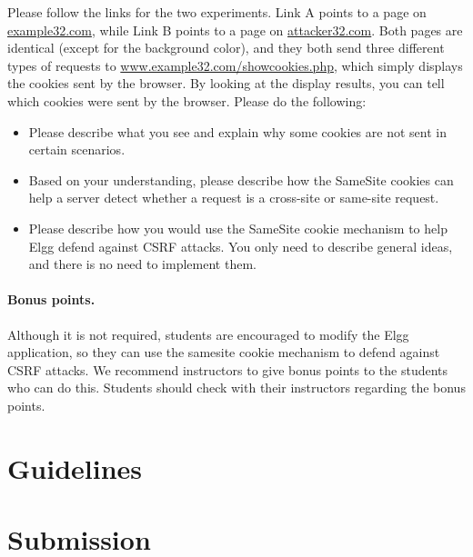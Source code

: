 Please follow the links for the two experiments. Link A points to a page 
on \url{example32.com}, while Link B points to a page 
on \url{attacker32.com}. Both pages are identical (except for the background
color), and they both send three different types of requests to
\url{www.example32.com/showcookies.php}, which
simply displays the cookies sent by the browser. By looking 
at the display results, you can tell which cookies were sent 
by the browser. Please do the following: 


\begin{itemize}
\item Please describe what you see and explain why some cookies are 
not sent in certain scenarios. 
 
\item Based on your understanding, please describe how the SameSite
cookies can help a server detect whether a request 
is a cross-site or same-site request. 

\item Please describe how you would use
the SameSite cookie mechanism to help Elgg defend against CSRF attacks. 
You only need to describe general ideas, and there is no need to 
implement them. 
\end{itemize}


\paragraph{Bonus points.} Although it is not required, students
are encouraged to modify the Elgg application, so they
can use the samesite cookie mechanism to defend against
CSRF attacks. We recommend instructors to give bonus points 
to the students who can do this. Students should check with 
their instructors regarding the bonus points.


\section{Guidelines}





\section{Submission}










